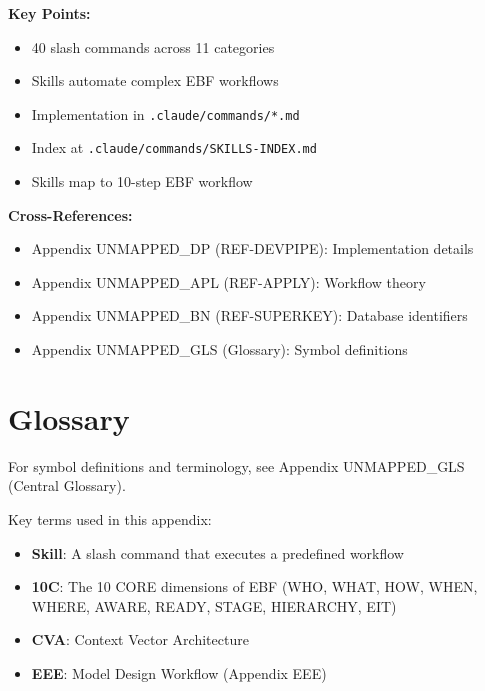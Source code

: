 \begin{tcolorbox}[colback=green!5!white, colframe=green!75!black,
    title=Summary: REF-SKILLS]

\textbf{Key Points:}
\begin{itemize}[nosep]
\item 40 slash commands across 11 categories
\item Skills automate complex EBF workflows
\item Implementation in \texttt{.claude/commands/*.md}
\item Index at \texttt{.claude/commands/SKILLS-INDEX.md}
\item Skills map to 10-step EBF workflow
\end{itemize}

\textbf{Cross-References:}
\begin{itemize}[nosep]
\item Appendix UNMAPPED_DP (REF-DEVPIPE): Implementation details
\item Appendix UNMAPPED_APL (REF-APPLY): Workflow theory
\item Appendix UNMAPPED_BN (REF-SUPERKEY): Database identifiers
\item Appendix UNMAPPED_GLS (Glossary): Symbol definitions
\end{itemize}

\end{tcolorbox}



\section{Glossary}

For symbol definitions and terminology, see Appendix UNMAPPED_GLS (Central Glossary).

Key terms used in this appendix:
\begin{itemize}
\item \textbf{Skill}: A slash command that executes a predefined workflow
\item \textbf{10C}: The 10 CORE dimensions of EBF (WHO, WHAT, HOW, WHEN, WHERE, AWARE, READY, STAGE, HIERARCHY, EIT)
\item \textbf{CVA}: Context Vector Architecture
\item \textbf{EEE}: Model Design Workflow (Appendix EEE)
\end{itemize}


